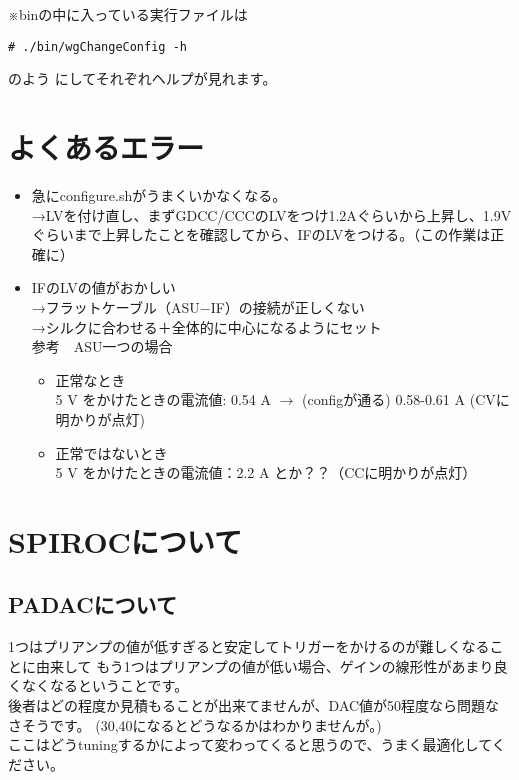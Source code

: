 ※binの中に入っている実行ファイルは
\begin{screen}
\begin{verbatim}
# ./bin/wgChangeConfig -h
\end{verbatim}
\end{screen}

のよう
にしてそれぞれヘルプが見れます。


\section{よくあるエラー}
\begin{itemize}
\item 急にconfigure.shがうまくいかなくなる。\\
→LVを付け直し、まずGDCC/CCCのLVをつけ1.2Aぐらいから上昇し、1.9Vぐらいまで上昇したことを確認してから、IFのLVをつける。（この作業は正確に）

\item IFのLVの値がおかしい\\
→フラットケーブル（ASU−IF）の接続が正しくない\\
→シルクに合わせる＋全体的に中心になるようにセット\\
参考　ASU一つの場合
\begin{itemize}
\item 正常なとき\\
5 V をかけたときの電流値: 0.54 A $\to$ (configが通る) 0.58-0.61 A (CVに明かりが点灯)
\item 正常ではないとき\\
5 V をかけたときの電流値：2.2 A とか？？（CCに明かりが点灯）
\end{itemize}
\end{itemize}

\newpage
\section{SPIROCについて}

\subsection{PADACについて}

1つはプリアンプの値が低すぎると安定してトリガーをかけるのが難しくなることに由来して
もう1つはプリアンプの値が低い場合、ゲインの線形性があまり良くなくなるということです。\\
後者はどの程度か見積もることが出来てませんが、DAC値が50程度なら問題なさそうです。
(30,40になるとどうなるかはわかりませんが。)\\
ここはどうtuningするかによって変わってくると思うので、うまく最適化してください。\\

